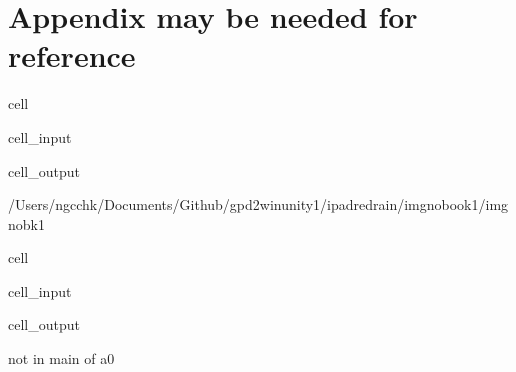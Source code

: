 \documentclass[letterpaper,10pt,english]{jupyterBook}
\begin{document}
\chapter{Appendix \sphinxhyphen{} may be needed for reference}
\label{\detokenize{MacTwgssAx-App:appendix-may-be-needed-for-reference}}\label{\detokenize{MacTwgssAx-App::doc}}
\begin{sphinxuseclass}{cell}\begin{sphinxVerbatimInput}

\begin{sphinxuseclass}{cell_input}
\begin{sphinxVerbatim}[commandchars=\\\{\}]
 

\end{sphinxVerbatim}

\end{sphinxuseclass}\end{sphinxVerbatimInput}
\begin{sphinxVerbatimOutput}

\begin{sphinxuseclass}{cell_output}
\begin{sphinxVerbatim}[commandchars=\\\{\}]
/Users/ngcchk/Documents/Github/gpd2\PYGZhy{}win\PYGZhy{}unity1/ipadred\PYGZhy{}rain/imgno\PYGZus{}book1/imgnobk1
\end{sphinxVerbatim}

\end{sphinxuseclass}\end{sphinxVerbatimOutput}

\end{sphinxuseclass}
\begin{sphinxuseclass}{cell}\begin{sphinxVerbatimInput}

\begin{sphinxuseclass}{cell_input}
\begin{sphinxVerbatim}[commandchars=\\\{\}]
 
\end{sphinxVerbatim}

\end{sphinxuseclass}\end{sphinxVerbatimInput}
\begin{sphinxVerbatimOutput}

\begin{sphinxuseclass}{cell_output}
\begin{sphinxVerbatim}[commandchars=\\\{\}]
not in main of a0
\end{sphinxVerbatim}

\end{sphinxuseclass}\end{sphinxVerbatimOutput}

\end{sphinxuseclass}
\end{document}
